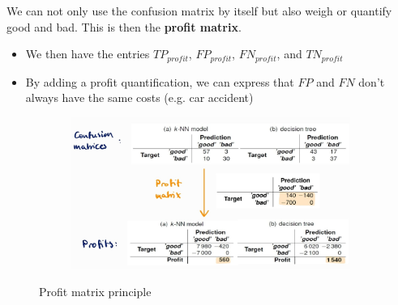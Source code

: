 We can not only use the confusion matrix by itself but also weigh or quantify good and bad. This is then the \textbf{profit matrix}.
\begin{itemize}
  \item We then have the entries $TP_{profit}$, $FP_{profit}$, $FN_{profit}$, and $TN_{profit}$
  \item By adding a profit quantification, we can express that $FP$ and $FN$ don't always have the same costs (e.g. car accident)
\end{itemize}

\begin{figure}[H]
  \centering
  \begin{subfigure}{0.7\textwidth}
    \centering
    \includegraphics[width=\textwidth]{assets/sl/ct__profit.jpg}
  \end{subfigure}

  \caption{Profit matrix principle}
  \label{fig:7_ct_profit}
\end{figure}
